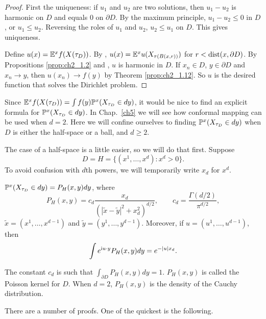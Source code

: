 \begin{proof}
First the uniqueness: if $u_1$ and $u_2$ are two solutions, then $u_1 - u_2$ is harmonic on $D$ and equals $0$ on $\partial D$. By the maximum principle, $u_1 - u_2 \leq 0$ in $D$, or $u_1 \leq u_2$. Reversing the roles of $u_1$ and $u_2$, $u_2 \leq u_1$ on $D$. This gives uniqueness.

Define $u(x) = \E^x f(X(\tau_D))$. By , $u(x) = \E^x u(X_{\tau(B(x,r))})$ for $r < \dist(x,\partial D)$. By Propositions \ref{prop:ch2_1.2} and , $u$ is harmonic in $D$. If $x_n \in D$, $y \in \partial D$ and $x_n \to y$, then $u(x_n) \to f(y)$ by Theorem \ref{prop:ch2_1.12}. So $u$ is the desired function that solves the Dirichlet problem.
\end{proof}


Since $\E^x f(X(\tau_D)) = \int f(y)\P^x(X_{\tau_D} \in dy)$, it would be nice to find an explicit formula for $\P^x(X_{\tau_D} \in dy)$. In Chap.\ \ref{ch5} we will see how conformal mapping can be used when $d = 2$. Here we will confine ourselves to finding $\P^x(X_{\tau_D} \in dy)$ when $D$ is either the half-space or a ball, and $d \geq 2$.

The case of a half-space is a little easier, so we will do that first. Suppose
\[
    D = H = \{(x^1,\ldots,x^d) : x^d > 0\}.
\]
To avoid confusion with $d$th powers, we will temporarily write $x_d$ for $x^d$.

\begin{theorem}\label{thm:ch2_1.16}
$\P^x(X_{\tau_D} \in dy) = P_H(x,y)dy$, where
\begin{equation}\label{eq:ch2_1.17}
    P_H(x,y) = c_d\frac{x_d}{(|\widetilde{x}-\widetilde{y}|^2 + x_d^2)^{d/2}}, \qquad c_d = \frac{\Gamma(d/2)}{\pi^{d/2}},
\end{equation}
$\widetilde{x} = (x^1,\ldots,x^{d-1})$ and $\widetilde{y} = (y^1,\ldots,y^{d-1})$. Moreover, if $u = (u^1,\ldots,u^{d-1})$, then
\[
    \int e^{\im u\cdot y}P_H(x,y)dy = e^{-|u|x_d}.
\]
\end{theorem}

The constant $c_d$ is such that $\int_{\partial D} P_H(x,y)dy = 1$. $P_H(x,y)$ is called the Poisson kernel for $D$. When $d = 2$, $P_H(x,y)$ is the density of the Cauchy distribution.

There are a number of proofs. One of the quickest is the following.

